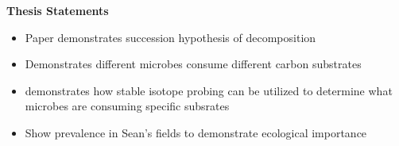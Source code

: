 \textbf{Thesis Statements}
\begin{itemize}
\item Paper demonstrates succession hypothesis of decomposition
\item Demonstrates different microbes consume different carbon substrates
\item demonstrates how stable isotope probing can be utilized to determine what microbes are consuming specific subsrates
\item Show prevalence in Sean's fields to demonstrate ecological importance
\end{itemize}


